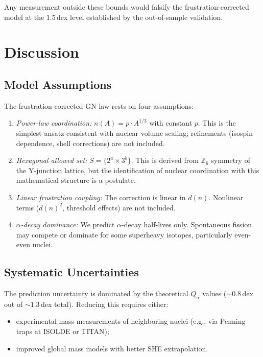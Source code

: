 \documentclass[12pt,a4paper,twocolumn]{revtex4-2}
\newcommand{\Qalpha}{Q_\alpha}
\newcommand{\dn}{d(n)}
\begin{document}
Any measurement outside these bounds would falsify the
frustration-corrected model at the $1.5$\,dex level
established by the out-of-sample validation.

\section{Discussion}
\label{sec:discussion}

\subsection{Model Assumptions}

The frustration-corrected GN law rests on four assumptions:
\begin{enumerate}
\item \emph{Power-law coordination:} $n(A) = p \cdot A^{1/3}$
  with constant $p$.  This is the simplest ansatz consistent
  with nuclear volume scaling; refinements (isospin
  dependence, shell corrections) are not included.

\item \emph{Hexagonal allowed set:} $S = \{2^a \times 3^b\}$.
  This is derived from $\mathbb{Z}_6$ symmetry of the
  Y-junction lattice, but the identification of nuclear
  coordination with this mathematical structure is a
  postulate.

\item \emph{Linear frustration coupling:} The correction is
  linear in $\dn$.  Nonlinear terms ($\dn^2$, threshold
  effects) are not included.

\item \emph{$\alpha$-decay dominance:} We predict
  $\alpha$-decay half-lives only.  Spontaneous fission
  may compete or dominate for some superheavy isotopes,
  particularly even-even nuclei.
\end{enumerate}

\subsection{Systematic Uncertainties}

The prediction uncertainty is dominated by the
theoretical $\Qalpha$ values ($\sim 0.8$\,dex out of
$\sim 1.3$\,dex total).  Reducing this requires either:
\begin{itemize}
\item experimental mass measurements of neighboring nuclei
  (e.g., via Penning traps at ISOLDE or TITAN);
\item improved global mass models with better SHE
  extrapolation.
\end{itemize}
\end{document}
